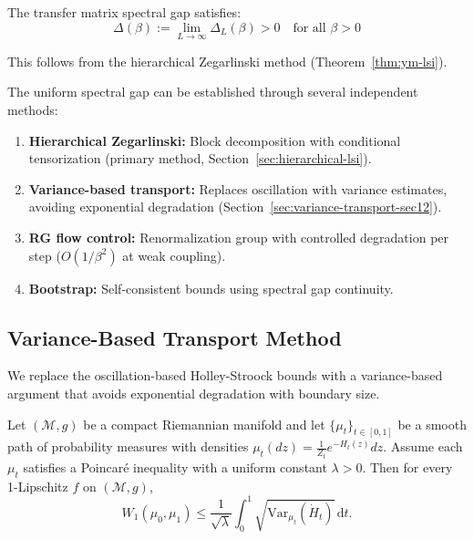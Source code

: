 \begin{theorem}
\label{thm:uniform-gap-v2}
The transfer matrix spectral gap satisfies:
\[
\Delta(\beta) := \lim_{L \to \infty} \Delta_L(\beta) > 0 \quad \text{for all } \beta > 0
\]

This follows from the hierarchical Zegarlinski method (Theorem~\ref{thm:ym-lsi}).
\end{theorem}

\begin{remark}
The uniform spectral gap can be established through several independent methods:
\begin{enumerate}
\item \textbf{Hierarchical Zegarlinski:} Block decomposition with conditional 
tensorization (primary method, Section~\ref{sec:hierarchical-lsi}).
\item \textbf{Variance-based transport:} Replaces oscillation with variance 
estimates, avoiding exponential degradation (Section~\ref{sec:variance-transport-sec12}).
\item \textbf{RG flow control:} Renormalization group with controlled degradation 
per step ($O(1/\beta^2)$ at weak coupling).
\item \textbf{Bootstrap:} Self-consistent bounds using spectral gap continuity.
\end{enumerate}
\end{remark}

\subsection{Variance-Based Transport Method}
\label{sec:variance-transport-app76}

We replace the oscillation-based Holley-Stroock bounds with a variance-based argument that avoids exponential degradation with boundary size.

\begin{lemma}
\label{lem:variance-transport}
Let $(\mathcal M,g)$ be a compact Riemannian manifold and let $\{\mu_t\}_{t\in[0,1]}$ be a smooth path of probability measures with densities $\mu_t(dz)=\frac{1}{Z_t}e^{-H_t(z)}dz$.
Assume each $\mu_t$ satisfies a Poincaré inequality with a uniform constant $\lambda>0$.
Then for every 1-Lipschitz $f$ on $(\mathcal M,g)$,
\[
W_1(\mu_0,\mu_1)
\le
\frac{1}{\sqrt{\lambda}}\int_0^1 \sqrt{\mathrm{Var}_{\mu_t}(\dot H_t)} \,\mathrm{d}t.
\]
\end{lemma}

